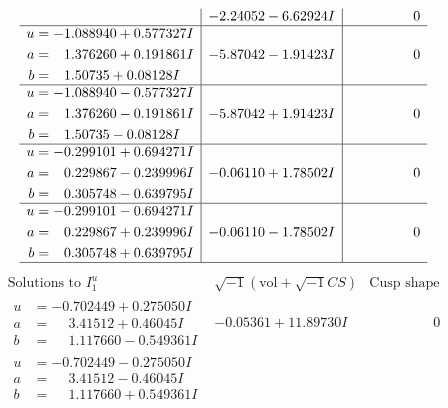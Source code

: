 \documentclass[1p]{elsarticle_modified}
\theoremstyle{definition}
\newcommand{\I}{\sqrt{-1}}
\begin{document}
$$\begin{array}{c|c|c}
 & -2.24052 - 6.62924 I & \phantom{-0.000000 } 0 \\ \hline\begin{aligned}
u &= -1.088940 + 0.577327 I \\
a &= \phantom{-}1.376260 + 0.191861 I \\
b &= \phantom{-}1.50735 + 0.08128 I\end{aligned}
 & -5.87042 - 1.91423 I & \phantom{-0.000000 } 0 \\ \hline\begin{aligned}
u &= -1.088940 - 0.577327 I \\
a &= \phantom{-}1.376260 - 0.191861 I \\
b &= \phantom{-}1.50735 - 0.08128 I\end{aligned}
 & -5.87042 + 1.91423 I & \phantom{-0.000000 } 0 \\ \hline\begin{aligned}
u &= -0.299101 + 0.694271 I \\
a &= \phantom{-}0.229867 - 0.239996 I \\
b &= \phantom{-}0.305748 - 0.639795 I\end{aligned}
 & -0.06110 + 1.78502 I & \phantom{-0.000000 } 0 \\ \hline\begin{aligned}
u &= -0.299101 - 0.694271 I \\
a &= \phantom{-}0.229867 + 0.239996 I \\
b &= \phantom{-}0.305748 + 0.639795 I\end{aligned}
 & -0.06110 - 1.78502 I & \phantom{-0.000000 } 0\\
 \hline 
 \end{array}$$\newpage$$\begin{array}{c|c|c}  
\text{Solutions to }I^u_{1}& \I (\text{vol} + \sqrt{-1}CS) & \text{Cusp shape}\\
 \hline 
\begin{aligned}
u &= -0.702449 + 0.275050 I \\
a &= \phantom{-}3.41512 + 0.46045 I \\
b &= \phantom{-}1.117660 - 0.549361 I\end{aligned}
 & -0.05361 + 11.89730 I & \phantom{-0.000000 } 0 \\ \hline\begin{aligned}
u &= -0.702449 - 0.275050 I \\
a &= \phantom{-}3.41512 - 0.46045 I \\
b &= \phantom{-}1.117660 + 0.549361 I\end{aligned}

\end{array}$$
\end{document}
